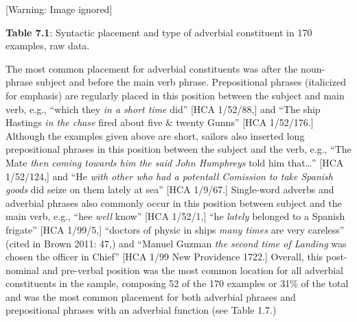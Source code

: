 \begin{styleStandard}
  [Warning: Image ignored] %
 
\end{styleStandard}


\begin{center}
 [Warning: Image ignored] %

\end{center}
\begin{styleStandard}
\textbf{Table 7.1}: Syntactic placement and type of adverbial constituent in 170 examples, raw data.
\end{styleStandard}


\begin{styleStandard}
The most common placement for adverbial constituents was after the noun-phrase subject and before the main verb phrase. Prepositional phrases (italicized for emphasis) are regularly placed in this position between the subject and main verb, e.g., “which they \textit{in a short time }did” [HCA 1/52/88,] and “The ship Hastings \textit{in the chase} fired about five \& twenty Gunns” [HCA 1/52/176.] Although the examples given above are short, sailors also inserted long prepositional phrases in this position between the subject and the verb, e.g., “The Mate \textit{then coming towards him the said John Humphreys} told him that…” [HCA 1/52/124,] and “He \textit{with other who had a potentall Comission to take Spanish goods} did seize on them lately at sea” [HCA 1/9/67.] Single-word adverbs and adverbial phrases also commonly occur in this position between subject and the main verb, e.g., “hee \textit{well} know” [HCA 1/52/1,] “he \textit{lately} belonged to a Spanish frigate” [HCA 1/99/5,] “doctors of physic in ships \textit{many times} are very careless” (cited in Brown 2011: 47,) and “Manuel Guzman \textit{the second time of Landing} was chosen the officer in Chief” [HCA 1/99 New Providence 1722.] Overall, this post-nominal and pre-verbal position was the most common location for all adverbial constituents in the sample, composing 52 of the 170 examples or 31\% of the total and was the most common placement for both adverbial phrases and prepositional phrases with an adverbial function (see Table 1.7.) 
\end{styleStandard}


